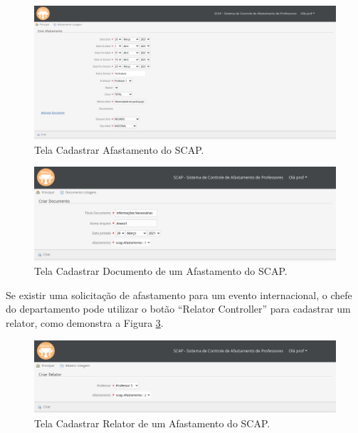 \begin{figure}[h]
	\centering
	\includegraphics[scale=0.33]{figuras/fig-projeto-cadastrar-afastamento} 
	\caption{Tela Cadastrar Afastamento do SCAP.}
	\label{fig-projeto-cadastrar-afastamento}
\end{figure}

\begin{figure}[h]
	\centering
	\includegraphics[scale=0.33]{figuras/fig-projeto-cadastrar-documento} 
	\caption{Tela Cadastrar Documento de um Afastamento do SCAP.}
	\label{fig-projeto-cadastrar-documento}
\end{figure}

Se existir uma solicitação de afastamento para um evento internacional, o chefe do departamento pode utilizar o botão ``Relator Controller'' para cadastrar um relator, como demonstra a Figura \ref{fig-projeto-cadastrar-relator}. 

\begin{figure}[h]
	\centering
	\includegraphics[scale=0.33]{figuras/fig-projeto-cadastrar-relator} 
	\caption{Tela Cadastrar Relator de um Afastamento do SCAP.}
	\label{fig-projeto-cadastrar-relator}
\end{figure}

